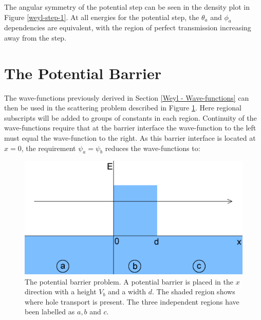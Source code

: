 		The angular symmetry of the potential step can be seen in the density plot in Figure \ref{weyl-step-1}. At all energies for the potential step, the $\theta_{a}$ and $\phi_{a}$ dependencies are equivalent, with the region of perfect transmission increasing away from the step.
		\section{The Potential Barrier}
		\label{weyl - Scattering Properties}
		The wave-functions previously derived in Section \ref{Weyl - Wave-functions} can then be used in the scattering problem described in Figure \ref{weyl-symmetrical-flat}. Here regional subscripts will be added to groups of constants in each region. Continuity of the wave-functions require that at the barrier interface the wave-function to the left must equal the wave-function to the right. As this barrier interface is located at $x=0$, the requirement $\psi_{a}=\psi_{b}$ reduces the wave-functions to:
		\begin{figure}[h]
			\centerline{\includegraphics[scale=0.7]{images/weyl-symmetrical-flat}}
			\caption{The potential barrier problem. A potential barrier is placed in the $x$ direction with a height $V_{b}$ and a width $d$. The shaded region shows where hole transport is present. The three independent regions have been labelled as $a,b$ and $c$.}
			\label{weyl-symmetrical-flat}
		\end{figure}

